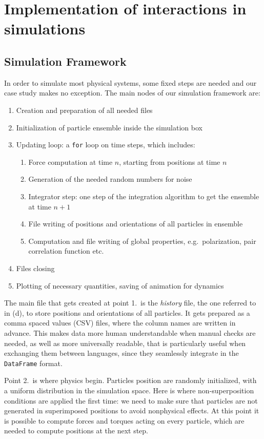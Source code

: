 \documentclass[../../master_thesis_np.tex]{subfiles}
\begin{document}
\chapter[Interaction Implementation]{Implementation of interactions in simulations}
\label{chap:int_impl}

	\section{Simulation Framework}
	In order to simulate most physical systems, some fixed steps are needed and our case study makes no exception. The main nodes of our simulation framework are:
	\begin{enumerate}
		\item Creation and preparation of all needed files
		\item Initialization of particle ensemble inside the simulation box
		\item Updating loop: a \verb|for| loop on time steps, which includes:
		\begin{enumerate}
			\item Force computation at time $n$, starting from positions at time $n$
			\item Generation of the needed random numbers for noise
			\item Integrator step: one step of the integration algorithm to get the ensemble at time $n+1$
			\item File writing of positions and orientations of all particles in ensemble
			\item Computation and file writing of global properties, e.g.\ polarization, pair correlation function etc.
		\end{enumerate}
		\item Files closing
		\item Plotting of necessary quantities, saving of animation for dynamics
	\end{enumerate}
	
	The main file that gets created at point 1.\ is the \emph{history} file, the one referred to in (d), to store positions and orientations of all particles. It gets prepared as a comma spaced values (CSV) files, where the column names are written in advance. This makes data more human understandable when manual checks are needed, as well as more universally readable, that is particularly useful when exchanging them between languages, since they seamlessly integrate in the \verb|DataFrame| format.
	
	Point 2.\ is where physics begin. Particles position are randomly initialized, with a uniform distribution in the simulation space. Here is where non-superposition conditions are applied the first time: we need to make sure that particles are not generated in superimposed positions to avoid nonphysical effects. At this point it is possible to compute forces and torques acting on every particle, which are needed to compute positions at the next step.  
	
\end{document}
